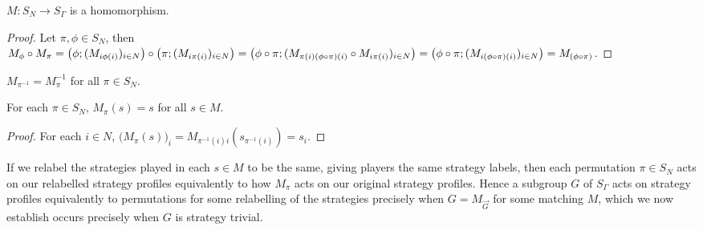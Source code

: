 \begin{lemma} \label{matchinghomoprop}
	$M:S_N\rightarrow{S_{\Gamma}}$ is a homomorphism.
	\begin{proof}
		Let $\pi, \phi \in S_N$, then $M_{\phi} \circ M_{\pi} = \bigl(\phi; (M_{i\phi(i)})_{i \in N}\bigr) \circ \bigl(\pi; (M_{i\pi(i)})_{i \in N}\bigr) = \bigl(\phi \circ \pi; (M_{\pi(i)(\phi\circ\pi)(i)} \circ M_{i\pi(i)})_{i \in N}\bigr) \newline = \bigl(\phi \circ \pi; (M_{i(\phi\circ\pi)(i)})_{i \in N}\bigr) = M_{(\phi \circ \pi)}$.
	\end{proof}
\end{lemma}

\begin{corollary}
	$M_{\pi^{-1}} = M_{\pi}^{-1}$ for all $\pi \in S_N$.
\end{corollary}

\begin{lemma} \label{matchingfixedpointlemma}
	For each $\pi \in S_N$, $M_{\pi}(s) = s$ for all $s \in M$.
	\begin{proof}
		For each $i \in N$, $\bigl(M_{\pi}(s)\bigr)_i = M_{\pi^{-1}(i)i}(s_{\pi^{-1}(i)}) = s_i$.
	\end{proof}
\end{lemma}

If we relabel the strategies played in each $s \in M$ to be the same, giving players the same strategy labels, then each permutation $\pi \in S_N$ acts on our relabelled strategy profiles equivalently to how $M_{\pi}$ acts on our original strategy profiles. Hence a subgroup $G$ of $S_{\Gamma}$ acts on strategy profiles equivalently to permutations for some relabelling of the strategies precisely when $G = M_{\overrightarrow{G}}$ for some matching $M$, which we now establish occurs precisely when $G$ is strategy trivial. 

